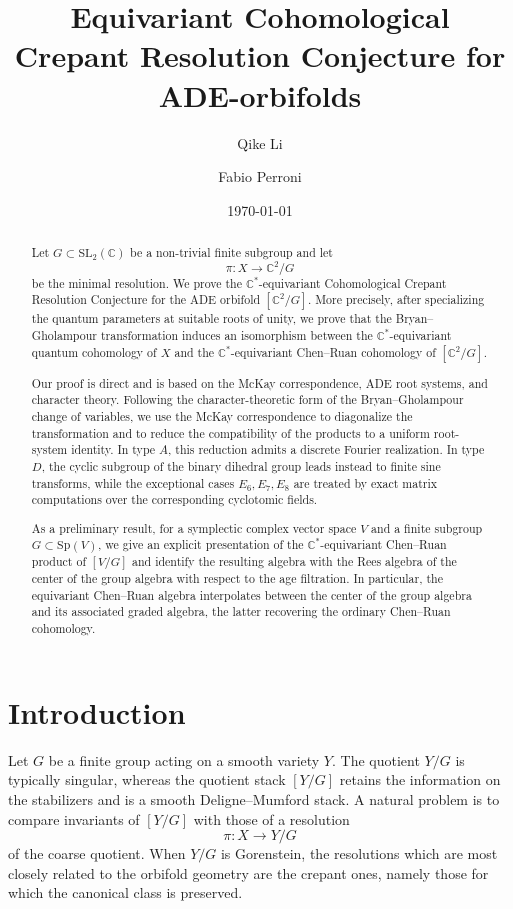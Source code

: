 \documentclass[a4paper,reqno]{amsart}
\title[Equivariant CCRC for ADE-orbifolds]{Equivariant Cohomological Crepant Resolution Conjecture for ADE-orbifolds}
\author{Qike Li}
\author{Fabio Perroni}
\theoremstyle{plain} %
\theoremstyle{definition} %
\theoremstyle{remark} %
\newcommand{\1}{\mathds{1}}   %
\begin{document}
\begin{abstract}
Let $G\subset \mathrm{SL}_2(\mathbb C)$ be a non-trivial finite subgroup and let
\[
\pi \colon X\longrightarrow \mathbb C^2/G
\]
be the minimal resolution. We prove the $\mathbb C^*$-equivariant
Cohomological Crepant Resolution Conjecture for the ADE orbifold
$[\mathbb C^2/G]$. More precisely, after specializing the quantum
parameters at suitable  roots of unity, we
prove that the Bryan--Gholampour transformation induces an
isomorphism between the $\mathbb C^*$-equivariant quantum cohomology
of $X$ and the $\mathbb C^*$-equivariant Chen--Ruan cohomology of
$[\mathbb C^2/G]$.

Our proof is direct and is based on the McKay correspondence, ADE root
systems, and character theory. 
Following the character-theoretic form of the Bryan–Gholampour change of variables, 
we use the McKay correspondence to diagonalize the transformation and to reduce the compatibility 
of the products to a uniform root-system identity. 
In type \(A\), this reduction admits a discrete Fourier realization. 
In type \(D\), the cyclic subgroup of the binary dihedral group leads instead to finite sine transforms, 
while the exceptional cases \(E_6,E_7,E_8\) are treated by exact matrix computations over the corresponding cyclotomic fields.

As a preliminary result, for a symplectic complex vector space $V$
and a finite subgroup $G\subset \mathrm{Sp}(V)$, we give an explicit
presentation of the $\mathbb C^*$-equivariant Chen--Ruan product of
$[V/G]$ and identify the resulting algebra with the Rees algebra of
the center of the group algebra with respect to the age filtration.
In particular, the equivariant Chen--Ruan algebra interpolates between
the center of the group algebra and its associated graded algebra,
the latter recovering the ordinary Chen--Ruan cohomology.
\end{abstract}

\date{\today}
\maketitle

\section{Introduction}\label{Section_introduction}

Let $G$ be a finite group acting on a smooth variety $Y$. The quotient
$Y/G$ is typically singular, whereas the quotient stack $[Y/G]$
retains the information on the stabilizers and is a smooth
Deligne--Mumford stack. A natural problem is to compare invariants of
$[Y/G]$ with those of a resolution
\[
\pi \colon X\longrightarrow Y/G
\]
of the coarse quotient. When $Y/G$ is Gorenstein, the resolutions
which are most closely related to the orbifold geometry are the
crepant ones, namely those for which the canonical class is preserved.
\end{document}
